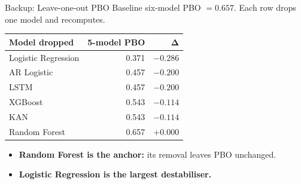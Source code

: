 \documentclass[aspectratio=169, t]{beamer}
\begin{document}
\begin{frame}{Backup: Leave-one-out PBO}
\vspace{-0.5em}
\centering
{\footnotesize Baseline six-model PBO $= 0.657$. Each row drops one model and recomputes.}
\vspace{0.5em}
\begin{center}
\renewcommand{\arraystretch}{1.3}
\scriptsize
\begin{tabular}{l r r}
\toprule
\textbf{Model dropped} & \textbf{5-model PBO} & $\mathbf{\Delta}$ \\
\midrule
Logistic Regression & 0.371 & $-0.286$ \\
AR Logistic         & 0.457 & $-0.200$ \\
LSTM                & 0.457 & $-0.200$ \\
XGBoost             & 0.543 & $-0.114$ \\
KAN                 & 0.543 & $-0.114$ \\
Random Forest       & 0.657 & $+0.000$ \\
\bottomrule
\end{tabular}
\end{center}
\vspace{0.4em}
\begin{itemize}\scriptsize
  \item \textbf{Random Forest is the anchor:} its removal leaves PBO unchanged.
  \item \textbf{Logistic Regression is the largest destabiliser.}
\end{itemize}
\end{frame}
\end{document}
